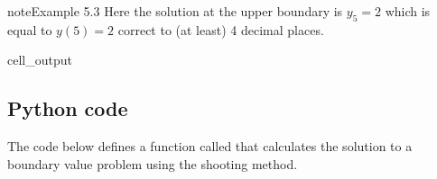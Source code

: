 \documentclass[letterpaper,10pt,english]{jupyterBook}
\begin{document}
\begin{sphinxadmonition}{note}{Example 5.3}
\sphinxAtStartPar
Here the solution at the upper boundary is \(y_5 = 2\) which is equal to \(y(5)=2\) correct to (at least) 4 decimal places.
\begin{sphinxVerbatimOutput}

\begin{sphinxuseclass}{cell_output}
\noindent{}

\end{sphinxuseclass}\end{sphinxVerbatimOutput}
\end{sphinxadmonition}


\subsection{Python code}
\label{\detokenize{5_BVPs/5.1_Shooting_method:python-code}}
\sphinxAtStartPar
The code below defines a function called  that calculates the solution to a boundary value problem using the shooting method.
\end{document}
